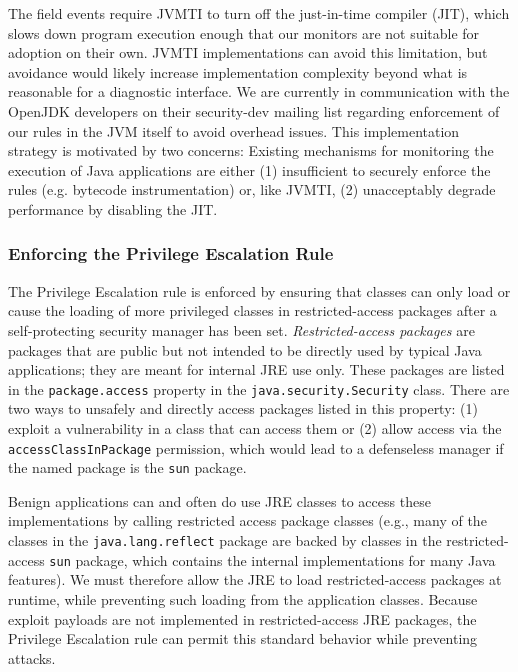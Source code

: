 \documentclass{sig-alternate}
\begin{document}
The field events require JVMTI to turn off the just-in-time compiler (JIT), which slows down program
execution enough that our monitors are not suitable for adoption on their
own. JVMTI implementations can avoid this limitation, but avoidance would likely
increase implementation complexity beyond what is reasonable for a diagnostic
interface. We are currently in communication with the OpenJDK developers on
their security-dev mailing list regarding enforcement of our rules in the JVM
itself to avoid overhead issues. This implementation strategy is motivated by
two concerns: Existing mechanisms for monitoring the execution of Java
applications are either (1) insufficient to securely enforce the rules
(e.g. bytecode instrumentation) or, like JVMTI, (2) unacceptably degrade
performance by disabling the JIT.

\subsubsection{Enforcing the Privilege Escalation Rule}\label{sub:Enforcing-the-Privilege}

The Privilege Escalation rule is enforced by ensuring that classes
can only load or cause the loading of more privileged classes in restricted-access
packages after a self-protecting security manager has been set. \textit{Restricted-access
packages} are packages that are public but not intended to be directly
used by typical Java applications; they are meant for internal JRE
use only. These packages are listed in the \texttt{package.access}
property in the \texttt{java.security.Security} class. There are two
ways to unsafely and directly access packages listed in this property:
(1) exploit a vulnerability in a class that can access them or (2)
allow access via the \texttt{accessClassInPackage} permission, which would lead to a defenseless manager if the named package is the \texttt{sun} package.

Benign applications can and often do use JRE classes to access these implementations by
calling restricted access package
classes (e.g., many of the classes in the \texttt{java.lang.reflect}
package are backed by classes in the restricted-access \texttt{sun} package, which
contains the internal implementations
for many Java features). We must therefore allow the JRE to load restricted-access packages
at runtime, while preventing such loading from the application classes.
Because exploit payloads are not implemented in restricted-access JRE packages,
the Privilege Escalation rule can permit this standard behavior while preventing
attacks.
\end{document}
